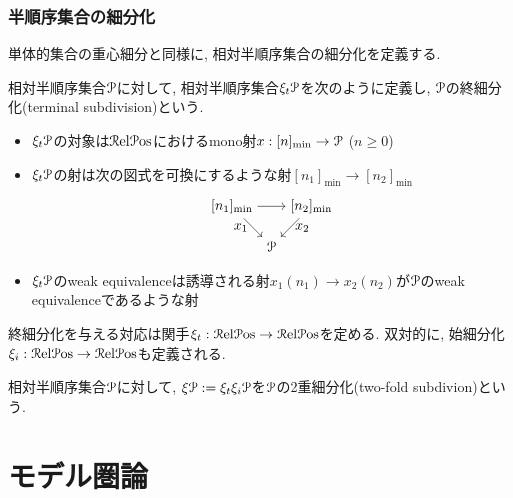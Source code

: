 \documentclass[aspectratio=169, dvipdfmx, 8pt, notheorems, uplatex]{beamer}
\begin{document}
\begin{frame}
  \frametitle{半順序集合の細分化}

  単体的集合の重心細分と同様に, 相対半順序集合の細分化を定義する. 

  \begin{definition}[終細分化]
    相対半順序集合$\P$に対して, 相対半順序集合$\xi_t\P$を次のように定義し, $\P$の終細分化(terminal subdivision)という. 
    \begin{itemize}
      \item $\xi_t\P$の対象は$\RelPos$におけるmono射$x : [n]_\min \to \P$ ($n \geq 0$)
      \item $\xi_t\P$の射は次の図式を可換にするような射$[n_1]_\min \to [n_2]_\min$
      \[
      \begin{tikzpicture}[,->]
        \node (upleft) at (0,0) {$[n_1]_\min$};
        \node (upright) at (2,0) {$[n_2]_\min$};
        \node (down) at (1,-1) {$\P$};
        \draw (upleft) -- (upright);
        \draw (upleft) -- node[left] {$x_1$} (down);
        \draw (upright) -- node[right] {$x_2$} (down);
      \end{tikzpicture}
      \]
      \item $\xi_t\P$のweak equivalenceは誘導される射$x_1(n_1) \to x_2(n_2)$が$\P$のweak equivalenceであるような射
    \end{itemize}
  \end{definition}

  終細分化を与える対応は関手$\xi_t : \RelPos \to \RelPos$を定める. 
  双対的に, 始細分化$\xi_i :  \RelPos \to \RelPos$も定義される. 

  \begin{definition}[2重細分化]
    相対半順序集合$\P$に対して, $\xi\P := \xi_t\xi_i\P$を$\P$の2重細分化(two-fold subdivion)という. 
  \end{definition}

\end{frame}

\section{モデル圏論}
\end{document}
